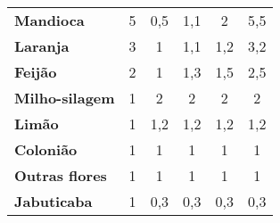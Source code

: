 \begin{table}[htbp]
\begin{tabular}{p{14.5em}|c|c|c|c|c}
    \rowcolor[rgb]{ .992,  .914,  .851} \textbf{Mandioca} & 5     & 0,5   & 1,1   & 2     & 5,5 \\
    \rowcolor[rgb]{ .984,  .831,  .706} \textbf{Laranja} & 3     & 1     & 1,1   & 1,2   & 3,2 \\
    \rowcolor[rgb]{ .992,  .914,  .851} \textbf{Feijão} & 2     & 1     & 1,3   & 1,5   & 2,5 \\
    \rowcolor[rgb]{ .984,  .831,  .706} \textbf{Milho-silagem} & 1     & 2     & 2     & 2     & 2 \\
    \rowcolor[rgb]{ .992,  .914,  .851} \textbf{Limão} & 1     & 1,2   & 1,2   & 1,2   & 1,2 \\
    \rowcolor[rgb]{ .984,  .831,  .706} \textbf{Colonião} & 1     & 1     & 1     & 1     & 1 \\
    \rowcolor[rgb]{ .992,  .914,  .851} \textbf{Outras flores} & 1     & 1     & 1     & 1     & 1 \\
    \rowcolor[rgb]{ .984,  .831,  .706} \textbf{Jabuticaba} & 1     & 0,3   & 0,3   & 0,3   & 0,3 \\
    \end{tabular}%
  \label{tab:cultivos_upas}%
\end{table}%
